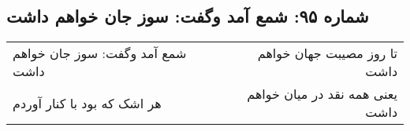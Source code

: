 \begin{center}
\section*{شماره ۹۵: شمع آمد وگفت: سوز جان خواهم داشت}
\label{sec:095}
\begin{longtable}{l p{0.5cm} r}
شمع آمد وگفت: سوز جان خواهم داشت
&&
تا روز مصیبت جهان خواهم داشت
\\
هر اشک که بود با کنار آوردم
&&
یعنی همه نقد در میان خواهم داشت
\\
\end{longtable}
\end{center}
